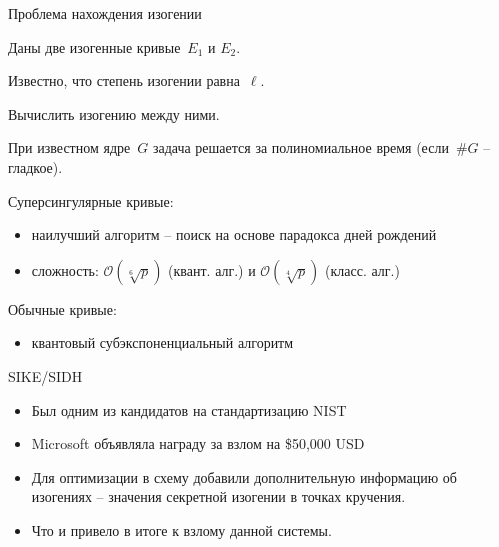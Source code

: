 \documentclass{beamer}
\begin{document}
\begin{frame}{Проблема нахождения изогении}
	\begin{center}
		\begin{tcolorbox}[enhanced,hbox,colback=title-and-section-color!5,colframe=title-and-section-color!120,title=Общая задача нахождения изогении,center title]
			\begin{varwidth}{\textwidth}
				\begin{center}
					Даны две изогенные кривые~$E_1$ и $E_2$. 
					
					Известно, что степень изогении равна~$\ell$. 
					
					Вычислить изогению между ними.
				\end{center}
			\end{varwidth}
		\end{tcolorbox}	
	\end{center}
При известном ядре~$G$ задача решается за полиномиальное время (если~$\#G$ -- гладкое).

\vspace{0.5em}
Суперсингулярные кривые:
\begin{itemize}
	\item наилучший алгоритм -- поиск на основе парадокса дней рождений
	\item сложность: $\mathcal{O}(\sqrt[6]{p})$ (квант. алг.) и $\mathcal{O}(\sqrt[4]{p})$ (класс. алг.)
\end{itemize}

\vspace{0.5em}
Обычные кривые: 
\begin{itemize}
	\item квантовый субэкспоненциальный алгоритм
\end{itemize}
\end{frame}

\begin{frame}{SIKE/SIDH}
	\begin{itemize}
		\item Был одним из кандидатов на стандартизацию NIST
		\item Microsoft объявляла награду за взлом на \$50,000 USD
		\item Для оптимизации в схему добавили дополнительную информацию об изогениях -- значения секретной изогении в точках кручения.
		\item Что и привело в итоге к взлому данной системы.
	\end{itemize}
\end{frame}
\end{document}
